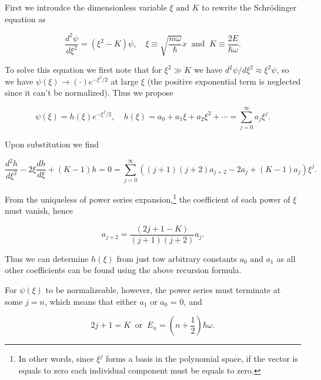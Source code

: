 \documentclass[a4paper,12pt]{report}
\begin{document}
First we introudce the dimensionless variable \(\xi \text { and } K\) to rewrite the Schrödinger equation as

\begin{equation}
  \frac{d^2\psi }{d\xi ^2} = \left( \xi ^2 - K \right) \psi , \quad \xi \equiv  \sqrt{\frac{m \omega }{\hbar } } x ~\text { and }~  K \equiv \frac{2E}{\hbar \omega }.   
\end{equation}

To solve this equation we first note that for \(\xi ^2 \gg K\) we have \(d^2 \psi / d \xi ^2 \approx \xi ^2\psi \), so we have \(\psi (\xi ) \to (\cdot )e^{-\xi ^2/2} \) at large \(\xi\) (the positive exponential term is neglected since it can't be normalized). Thus we propose 

\begin{equation}
  \psi (\xi ) = h(\xi ) e^{- \xi ^2 /2}, \quad h(\xi ) = a_0  + a_1 \xi + a_2 \xi ^2 + \cdots = \sum_{j=0}^{\infty} a_{j}\xi ^{j}.   
\end{equation}

Upon substitution we find

\begin{equation}
  \frac{d^2h}{d\xi ^2} - 2\xi \frac{dh}{d\xi } + (K-1) h = 0 = \sum_{j=0}^{\infty} \left( (j+1)(j+2)a_{j+2} - 2a_{j} + (K-1)a_{j}    \right) \xi ^{j}.  
\end{equation}

From the uniqueless of power series expansion,\footnote{In other words, since \(\xi ^{j} \) forms a basis in the polynomial space, if the vector is equals to zero each individual component must be equals to zero.} the coefficient of each power of \(\xi \) must vanish, hence

\begin{equation}
  a_{j+2} = \frac{(2j + 1 - K)}{(j+1)(j+2)}a_{j}.
\end{equation}

Thus we can determine \(h(\xi )\) from just tow arbitrary constants \(a_0 \text { and } a_1 \) as all other coefficients can be found using the above recursion formula.  

For \(\psi (\xi )\) to be normalizeable, however, the power series must terminate at some \(j = n\), which means that either \(a_1 \text { or } a_0 \) = 0, and

\begin{equation}
  2j+1 = K ~\text { or }~ E_{n} = \left( n + \frac{1}{2}  \right) \hbar \omega .
\end{equation}
\end{document}
